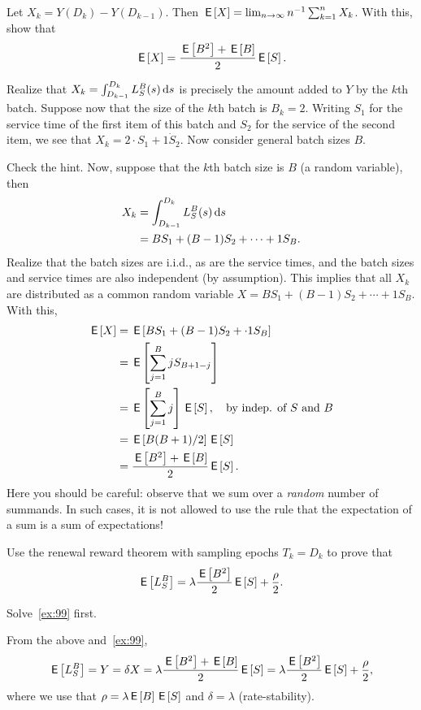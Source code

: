 \begin{extra}\label{ex:99}
Let $X_k = Y(D_k)-Y(D_{k-1})$. Then $\,\mathsf{E}\left[X\right] = \lim_{n\to\infty} n^{-1} \sum_{k=1}^n X_k$. With this, show that
\begin{equation*}
  \,\mathsf{E}\left[X\right] = \frac{\,\mathsf{E}\left[B^2\right]+\,\mathsf{E}\left[B\right]}2 \,\mathsf{E}\left[S\right].
\end{equation*}
\begin{hint}
  Realize that $X_k = \int_{D_{k-1}}^{D_k} L_S^B(s) \,\text{d}s$ is precisely the amount added to $Y$ by the $k$th batch.
  Suppose now that the size of the $k$th batch is $B_k = 2$.
  Writing $S_1$ for the service time of the first item of this batch and $S_2$ for the service of the second item, we see that $X_k = 2\cdot S_1 + 1\dot S_2$.
  Now consider general batch sizes $B$.
\end{hint}
\begin{solution}
  Check the hint. Now, suppose that the $k$th batch size is $B$ (a random variable), then
  \begin{align*}
    X_k &= \int_{D_{k-1}}^{D_k} L_S^B(s) \,\text{d}s \\
    &= B S_1 + (B-1)S_2 + \cdots + 1 S_B.
  \end{align*}
  Realize that the batch sizes are i.i.d., as are the service times, and the batch sizes and service times are also independent (by assumption).
  This implies that all $X_k$ are distributed as a common random variable $X= B S_1 + (B-1)S_2 + \cdots + 1 S_B$.
  With this,
  \begin{align*}
    \,\mathsf{E}\left[X\right] & = \,\mathsf{E}\left[B S_1 + (B-1)S_2 + \cdot 1 S_B\right]\\
    &= \,\mathsf{E}\left[\sum_{j=1}^B j S_{B+1-j}\right] \\
    &= \,\mathsf{E}\left[\sum_{j=1}^B j\right] \,\mathsf{E}\left[S\right], \quad\text{by indep. of $S$ and $B$} \\
    &= \,\mathsf{E}\left[B(B+1)/2\right] \,\mathsf{E}\left[S\right] \\
    &= \frac{\,\mathsf{E}\left[B^2\right]+\,\mathsf{E}\left[B\right]}2 \,\mathsf{E}\left[S\right].
  \end{align*}
  Here you should be careful: observe that we sum over a \emph{random} number of summands.
  In such cases, it is not allowed to use the rule that the expectation of a sum is a sum of expectations!
\end{solution}
\end{extra}


\begin{exercise}\label{ex:100}
Use the renewal reward theorem with sampling epochs $T_k = D_k$ to prove that
\begin{equation*}
  \,\mathsf{E}\left[L_S^B\right] = \lambda \frac{\,\mathsf{E}\left[B^2\right]}2\,\mathsf{E}\left[S\right] + \frac\rho 2.
\end{equation*}
\begin{hint}
  Solve~\cref{ex:99} first. 
\end{hint}
\begin{solution}
  From the above and~\cref{ex:99},
  \begin{equation*}
    \,\mathsf{E}\left[L_S^B\right] = Y = \delta X = \lambda \frac{\,\mathsf{E}\left[B^2\right]+\,\mathsf{E}\left[B\right]}2 \,\mathsf{E}\left[S\right] =  \lambda \frac{\,\mathsf{E}\left[B^2\right]}{2} \,\mathsf{E}\left[S\right] + \frac \rho 2,
  \end{equation*}
where we use that $\rho = \lambda \,\mathsf{E}\left[B\right] \,\mathsf{E}\left[S\right]$ and $\delta = \lambda$ (rate-stability).
\end{solution}
\end{exercise}




